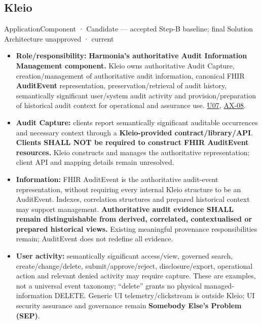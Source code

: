 \subsection{Kleio}

\label{element:fefda110e2274884ad58906733606efd}
{\small ApplicationComponent · Candidate — accepted Step-B baseline; final Solution Architecture unapproved · current}\par

\begin{itemize}


\item \textbf{Role/responsibility:} \textbf{Harmonia's authoritative Audit Information Management
  component.} Kleio owns authoritative Audit Capture, creation/management of
  authoritative audit information, canonical FHIR \textbf{AuditEvent} representation,
  preservation/retrieval of audit history, semantically significant user/system
  audit activity and provision/preparation of historical audit context for
  operational and assurance use. \href{\detokenize{../../../../../docs/markdown/05-information-systems-architecture/sources.md#u07}}{U07}, \hyperref[element:21d6864657964ba5b03e3f6b5eb29cd5]{AX-08}.

\item \textbf{Audit Capture:} clients report semantically significant auditable occurrences
  and necessary context through a \textbf{Kleio-provided contract/library/API}.
  \textbf{Clients SHALL NOT be required to construct FHIR AuditEvent resources.} Kleio
  constructs and manages the authoritative representation; client API and mapping
  details remain unresolved.

\item \textbf{Information:} FHIR AuditEvent is the authoritative audit-event representation,
  without requiring every internal Kleio structure to be an AuditEvent. Indexes,
  correlation structures and prepared historical context may support management.
  \textbf{Authoritative audit evidence SHALL remain distinguishable from derived,
  correlated, contextualised or prepared historical views.} Existing meaningful
  provenance responsibilities remain; AuditEvent does not redefine all evidence.

\item \textbf{User activity:} semantically significant access/view, governed search,
  create/change/delete, submit/approve/reject, disclosure/export, operational action
  and relevant denied activity may require capture. These are examples, not a
  universal event taxonomy; “delete” grants no physical managed-information DELETE.
  Generic UI telemetry/clickstream is outside Kleio; UI security assurance and
  governance remain \textbf{Somebody Else's Problem (SEP)}.


\end{itemize}
